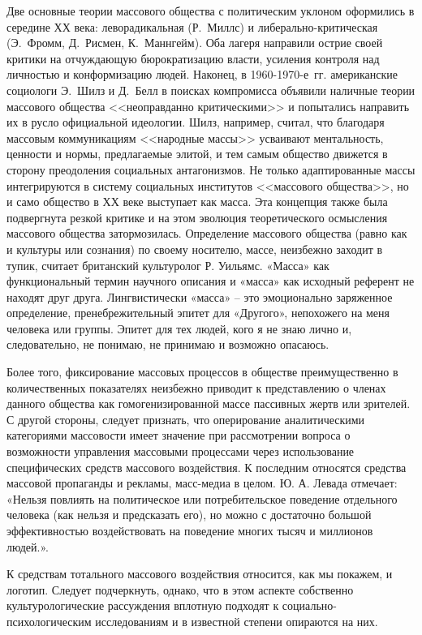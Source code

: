 Две основные теории массового общества
с политическим уклоном оформились в середине ХХ века: леворадикальная (Р.~Миллс)
и либерально-критическая (Э.~Фромм, Д.~Рисмен, К.~Маннгейм). Оба лагеря направили острие своей критики
на отчуждающую бюрократизацию власти, усиления контроля над личностью и конформизацию людей.
Наконец, в 1960-1970-е~гг. американские социологи Э.~Шилз и Д.~Белл в поисках компромисса объявили
наличные теории массового общества <<неоправданно критическими>> и попытались направить их в русло
официальной идеологии. Шилз, например, считал, что благодаря массовым коммуникациям <<народные массы>>
усваивают ментальность, ценности и нормы, предлагаемые элитой, и тем самым общество движется в сторону
преодоления социальных антагонизмов. Не только адаптированные массы интегрируются в систему
социальных институтов <<массового общества>>, но и само общество в ХХ веке выступает как масса.
Эта концепция также была подвергнута резкой критике и на этом эволюция теоретического осмысления массового
общества затормозилась. Определение массового общества (равно как и культуры или сознания) по своему носителю, массе, неизбежно заходит в тупик, считает британский культуролог Р.  Уильямс. «Масса» как функциональный термин научного описания и «масса» как исходный референт не находят друг друга. Лингвистически «масса» – это эмоционально заряженное определение, пренебрежительный эпитет для «Другого», непохожего на меня человека или группы. Эпитет для тех людей, кого я не знаю лично и, следовательно, не понимаю, не принимаю и возможно опасаюсь\autocite{williams1985}\autocite{williams1989}\autocite{williams2006}.

Более того, фиксирование массовых процессов в обществе преимущественно в количественных показателях неизбежно приводит к представлению о членах данного общества как гомогенизированной массе пассивных жертв или зрителей\autocite{levada2001}. С другой стороны, следует признать, что оперирование аналитическими категориями массовости   имеет значение при рассмотрении вопроса о возможности управления массовыми процессами через использование специфических средств массового воздействия. К последним относятся средства массовой пропаганды и рекламы, масс-медиа в целом. Ю. А. Левада отмечает: «Нельзя повлиять на политическое или потребительское поведение отдельного человека (как нельзя и предсказать его), но можно с достаточно большой эффективностью воздействовать на поведение многих тысяч и миллионов людей.»\autocite{levada2001}.

К средствам тотального массового воздействия относится, как мы покажем, и логотип. Следует подчеркнуть, однако, что в этом аспекте собственно культурологические рассуждения вплотную подходят к социально-психологическим исследованиям и в известной степени опираются на них.

